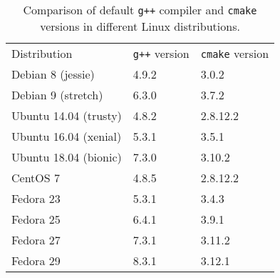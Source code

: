 \documentclass[12pt,a4paper]{report}
\begin{document}
\begin{table}[H]
\centering
\caption{Comparison of default \texttt{g++} compiler and \texttt{cmake} versions in different Linux distributions.}
\vspace*{3pt}
\begin{tabular}{M{0.35\textwidth}M{0.20\textwidth}M{0.20\textwidth}}
   \toprule[1.4pt]
   Distribution & \texttt{g++} version & \texttt{cmake} version \\
   Debian 8 (jessie) & 4.9.2 & 3.0.2 \\
   Debian 9 (stretch) & 6.3.0 & 3.7.2 \\
   Ubuntu 14.04 (trusty) & 4.8.2 & 2.8.12.2 \\
   Ubuntu 16.04 (xenial) & 5.3.1 & 3.5.1 \\
   Ubuntu 18.04 (bionic) & 7.3.0 & 3.10.2 \\
   CentOS 7 & 4.8.5 & 2.8.12.2 \\
   Fedora 23 & 5.3.1 & 3.4.3 \\
   Fedora 25 & 6.4.1 & 3.9.1 \\
   Fedora 27 & 7.3.1 & 3.11.2 \\
   Fedora 29 & 8.3.1 & 3.12.1 \\
   \bottomrule[1.4pt]
   \end{tabular}
   \label{tab:distroVersions}
\end{table}
\end{document}
